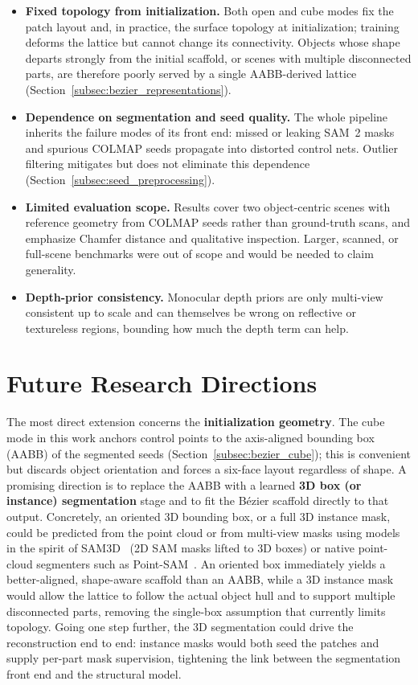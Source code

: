 \begin{itemize}
    \item \textbf{Fixed topology from initialization.} Both open and cube modes fix the patch layout and, in practice, the surface topology at initialization; training deforms the lattice but cannot change its connectivity. Objects whose shape departs strongly from the initial scaffold, or scenes with multiple disconnected parts, are therefore poorly served by a single AABB-derived lattice (Section~\ref{subsec:bezier_representations}).
    \item \textbf{Dependence on segmentation and seed quality.} The whole pipeline inherits the failure modes of its front end: missed or leaking SAM~2 masks and spurious COLMAP seeds propagate into distorted control nets. Outlier filtering mitigates but does not eliminate this dependence (Section~\ref{subsec:seed_preprocessing}).
    \item \textbf{Limited evaluation scope.} Results cover two object-centric scenes with reference geometry from COLMAP seeds rather than ground-truth scans, and emphasize Chamfer distance and qualitative inspection. Larger, scanned, or full-scene benchmarks were out of scope and would be needed to claim generality.
    \item \textbf{Depth-prior consistency.} Monocular depth priors are only multi-view consistent up to scale and can themselves be wrong on reflective or textureless regions, bounding how much the depth term can help.
\end{itemize}

\section{Future Research Directions}

The most direct extension concerns the \textbf{initialization geometry}. The cube mode in this work anchors control points to the axis-aligned bounding box (AABB) of the segmented seeds (Section~\ref{subsec:bezier_cube}); this is convenient but discards object orientation and forces a six-face layout regardless of shape. A promising direction is to replace the AABB with a learned \textbf{3D box (or instance) segmentation} stage and to fit the B\'ezier scaffold directly to that output. Concretely, an oriented 3D bounding box, or a full 3D instance mask, could be predicted from the point cloud or from multi-view masks using models in the spirit of SAM3D~\cite{zhang2023sam3d} (2D SAM masks lifted to 3D boxes) or native point-cloud segmenters such as Point-SAM~\cite{zhou2025pointsam}. An oriented box immediately yields a better-aligned, shape-aware scaffold than an AABB, while a 3D instance mask would allow the lattice to follow the actual object hull and to support multiple disconnected parts, removing the single-box assumption that currently limits topology. Going one step further, the 3D segmentation could drive the reconstruction end to end: instance masks would both seed the patches and supply per-part mask supervision, tightening the link between the segmentation front end and the structural model.

